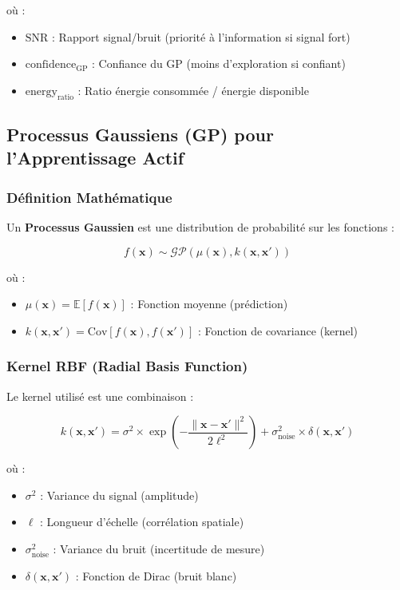 \documentclass[12pt,a4paper]{article}
\newcommand{\gp}{\textsc{GP}}
\begin{document}
où :
\begin{itemize}
    \item $\text{SNR}$ : Rapport signal/bruit (priorité à l'information si signal fort)
    \item $\text{confidence}_{\text{GP}}$ : Confiance du \gp{} (moins d'exploration si confiant)
    \item $\text{energy}_{\text{ratio}}$ : Ratio énergie consommée / énergie disponible
\end{itemize}

\subsection{Processus Gaussiens (\gp{}) pour l'Apprentissage Actif}

\subsubsection{Définition Mathématique}

Un \textbf{Processus Gaussien} est une distribution de probabilité sur les fonctions :

\begin{equation}
f(\mathbf{x}) \sim \mathcal{GP}(\mu(\mathbf{x}), k(\mathbf{x}, \mathbf{x}'))
\end{equation}

où :
\begin{itemize}
    \item $\mu(\mathbf{x}) = \mathbb{E}[f(\mathbf{x})]$ : Fonction moyenne (prédiction)
    \item $k(\mathbf{x}, \mathbf{x}') = \text{Cov}[f(\mathbf{x}), f(\mathbf{x}')]$ : Fonction de covariance (kernel)
\end{itemize}

\subsubsection{Kernel RBF (Radial Basis Function)}

Le kernel utilisé est une combinaison :

\begin{equation}
k(\mathbf{x}, \mathbf{x}') = \sigma^2 \times \exp\left(-\frac{\|\mathbf{x} - \mathbf{x}'\|^2}{2\ell^2}\right) + \sigma^2_{\text{noise}} \times \delta(\mathbf{x}, \mathbf{x}')
\end{equation}

où :
\begin{itemize}
    \item $\sigma^2$ : Variance du signal (amplitude)
    \item $\ell$ : Longueur d'échelle (corrélation spatiale)
    \item $\sigma^2_{\text{noise}}$ : Variance du bruit (incertitude de mesure)
    \item $\delta(\mathbf{x}, \mathbf{x}')$ : Fonction de Dirac (bruit blanc)
\end{itemize}
\end{document}
